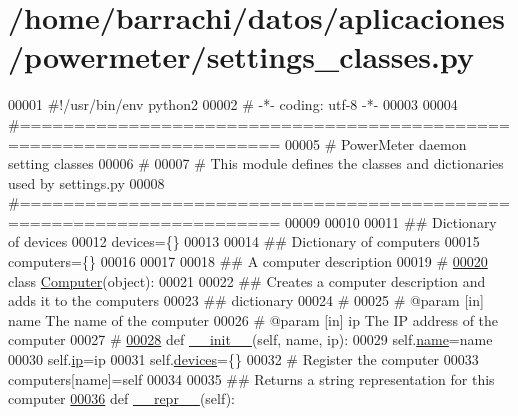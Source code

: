 \hypertarget{settings__classes_8py_source}{\section{/home/barrachi/datos/aplicaciones/powermeter/settings\-\_\-classes.py}
}

\begin{DoxyCode}
00001 \textcolor{comment}{#!/usr/bin/env python2}
00002 \textcolor{comment}{# -*- coding: utf-8 -*-}
00003 
00004 \textcolor{comment}{#======================================================================}
00005 \textcolor{comment}{# PowerMeter daemon setting classes}
00006 \textcolor{comment}{#}
00007 \textcolor{comment}{# This module defines the classes and dictionaries used by settings.py}
00008 \textcolor{comment}{#======================================================================}
00009 
00010 
00011 \textcolor{comment}{## Dictionary of devices}
00012 devices=\{\}
00013 
00014 \textcolor{comment}{## Dictionary of computers}
00015 computers=\{\}
00016 
00017 
00018 \textcolor{comment}{## A computer description}
00019 \textcolor{comment}{#}
\hypertarget{settings__classes_8py_source_l00020}{}\hyperlink{classsettings__classes_1_1_computer}{00020} \textcolor{keyword}{class }\hyperlink{classsettings__classes_1_1_computer}{Computer}(object):
00021 
00022     \textcolor{comment}{## Creates a computer description and adds it to the computers}
00023     \textcolor{comment}{## dictionary}
00024     \textcolor{comment}{#}
00025     \textcolor{comment}{# @param [in] name  The name of the computer}
00026     \textcolor{comment}{# @param [in] ip    The IP address of the computer}
00027     \textcolor{comment}{#}
\hypertarget{settings__classes_8py_source_l00028}{}\hyperlink{classsettings__classes_1_1_computer_ab74e6bf80237ddc4109968cedc58c151}{00028}     \textcolor{keyword}{def }\hyperlink{classsettings__classes_1_1_computer_ac775ee34451fdfa742b318538164070e}{__init__}(self, name, ip):
00029         self.\hyperlink{classsettings__classes_1_1_computer_ab74e6bf80237ddc4109968cedc58c151}{name}=name
00030         self.\hyperlink{classsettings__classes_1_1_computer_afd65cf072a93c93ad52b9f25b341e10b}{ip}=ip
00031         self.\hyperlink{classsettings__classes_1_1_computer_aa4b88f24716e66e8d41400b00e8ae8ae}{devices}=\{\}
00032         \textcolor{comment}{# Register the computer}
00033         computers[name]=self
00034         
00035     \textcolor{comment}{## Returns a string representation for this computer}
\hypertarget{settings__classes_8py_source_l00036}{}\hyperlink{classsettings__classes_1_1_computer_ad8b9328939df072e4740cd9a63189744}{00036}     \textcolor{keyword}{def }\hyperlink{classsettings__classes_1_1_computer_ad8b9328939df072e4740cd9a63189744}{__repr__}(self):

\end{DoxyCode}
